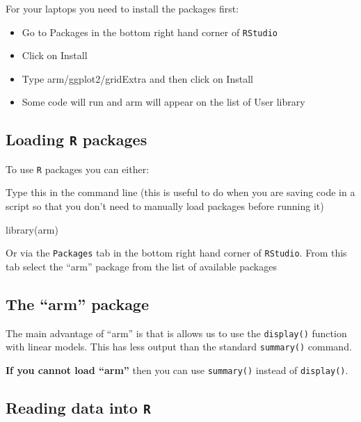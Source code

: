 \documentclass[
]{gitbook}
\newenvironment{Shaded}{\begin{snugshade}}{\end{snugshade}}
\newcommand{\FunctionTok}[1]{\textcolor[rgb]{0.00,0.00,0.00}{#1}}
\newcommand{\NormalTok}[1]{#1}
\providecommand{\tightlist}{%
  \setlength{\itemsep}{0pt}\setlength{\parskip}{0pt}}
\begin{document}
For your laptops you need to install the packages first:

\begin{itemize}
\tightlist
\item
  Go to Packages in the bottom right hand corner of \texttt{RStudio}
\item
  Click on Install
\item
  Type arm/ggplot2/gridExtra and then click on Install
\item
  Some code will run and arm will appear on the list of User library
\end{itemize}

\hypertarget{loading-r-packages}{%
\subsection{\texorpdfstring{Loading \texttt{R} packages}{Loading R packages}}\label{loading-r-packages}}

To use \texttt{R} packages you can either:

Type this in the command line (this is useful to do when you are saving code in a script so that you don't need to manually load packages before running it)

\begin{Shaded}
\begin{Highlighting}[]
\FunctionTok{library}\NormalTok{(arm)}
\end{Highlighting}
\end{Shaded}

Or via the \texttt{Packages} tab in the bottom right hand corner of \texttt{RStudio}. From this tab select the ``arm'' package from the list of available packages

\hypertarget{the-arm-package}{%
\subsection{The ``arm'' package}\label{the-arm-package}}

The main advantage of ``arm'' is that is allows us to use the \texttt{display()} function with linear models. This has less output than the standard \texttt{summary()} command.

\textbf{If you cannot load ``arm''} then you can use \texttt{summary()} instead of \texttt{display()}.

\hypertarget{reading-data-into-r}{%
\subsection{\texorpdfstring{Reading data into \texttt{R}}{Reading data into R}}\label{reading-data-into-r}}
\end{document}
